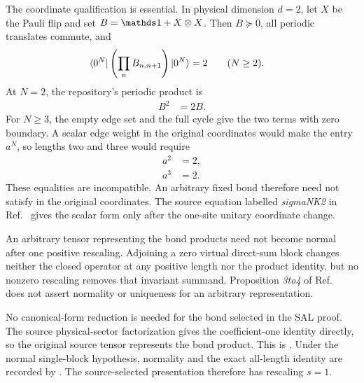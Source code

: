 \documentclass{article}
\begin{document}
The coordinate qualification is essential. In physical dimension $d=2$, let
$X$ be the Pauli flip and set $B=\Id+X\otimes X$. Then $B\succeq0$, all
periodic translates commute, and
\begin{align}
    \langle 0^N|
        \left(\prod_n B_{n,n+1}\right)
        |0^N\rangle
        &=2
        \qquad(N\geq2).
    \label{eq:cpsv16_commuting_form_to_sal_pauli_bond_zero_boundary_entry}
\end{align}
At $N=2$, the repository's periodic product is
\begin{align}
    B^2
        &=2B.
    \label{eq:cpsv16_commuting_form_to_sal_pauli_bond_length_two_product}
\end{align}
For $N\geq3$, the empty edge set and the full cycle give the two terms with
zero boundary. A scalar edge weight in the original coordinates would make
the entry $a^N$, so lengths two and three would require
\begin{align}
    a^2
        &=2,
    \label{eq:cpsv16_commuting_form_to_sal_pauli_scalar_length_two}\\
    a^3
        &=2.
    \label{eq:cpsv16_commuting_form_to_sal_pauli_scalar_length_three}
\end{align}
These equalities are incompatible. An arbitrary fixed bond therefore need not
satisfy
 in the
original coordinates. The source equation labelled \emph{sigmaNK2} in
Ref.~\cite{Cirac2016MPDO_arXiv} gives the scalar form only after the
one-site unitary coordinate change.

An arbitrary tensor representing the bond products need not become normal
after one positive rescaling. Adjoining a zero virtual direct-sum block changes
neither the closed operator at any positive length nor the product identity,
but no nonzero rescaling removes that invariant summand. Proposition
\emph{3to4} of Ref.~\cite{Cirac2016MPDO_arXiv} does not assert normality or
uniqueness for an arbitrary representation.

No canonical-form reduction is needed for the bond selected in the SAL proof.
The source physical-sector factorization gives the coefficient-one identity
directly, so the original source tensor represents the bond product. This is
. Under
the normal single-block hypothesis, normality and the exact all-length identity
are recorded by
. The
source-selected presentation therefore has rescaling $s=1$.
\end{document}
